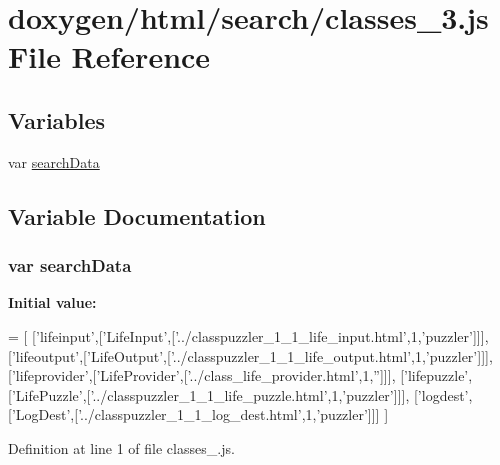 \hypertarget{a00064}{}\section{doxygen/html/search/classes\+\_\+3.js File Reference}
\label{a00064}
\subsection*{Variables}
\begin{DoxyCompactItemize}
\item 
var \hyperlink{a00064_ad01a7523f103d6242ef9b0451861231e}{search\+Data}
\end{DoxyCompactItemize}


\subsection{Variable Documentation}
\hypertarget{a00064_ad01a7523f103d6242ef9b0451861231e}{}
\subsubsection[{search\+Data}]{\setlength{\rightskip}{0pt plus 5cm}var search\+Data}\label{a00064_ad01a7523f103d6242ef9b0451861231e}
{\bfseries Initial value\+:}
\begin{DoxyCode}
=
[
  [\textcolor{stringliteral}{'lifeinput'},[\textcolor{stringliteral}{'LifeInput'},[\textcolor{stringliteral}{'../classpuzzler\_1\_1\_life\_input.html'},1,\textcolor{stringliteral}{'puzzler'}]]],
  [\textcolor{stringliteral}{'lifeoutput'},[\textcolor{stringliteral}{'LifeOutput'},[\textcolor{stringliteral}{'../classpuzzler\_1\_1\_life\_output.html'},1,\textcolor{stringliteral}{'puzzler'}]]],
  [\textcolor{stringliteral}{'lifeprovider'},[\textcolor{stringliteral}{'LifeProvider'},[\textcolor{stringliteral}{'../class\_life\_provider.html'},1,\textcolor{stringliteral}{''}]]],
  [\textcolor{stringliteral}{'lifepuzzle'},[\textcolor{stringliteral}{'LifePuzzle'},[\textcolor{stringliteral}{'../classpuzzler\_1\_1\_life\_puzzle.html'},1,\textcolor{stringliteral}{'puzzler'}]]],
  [\textcolor{stringliteral}{'logdest'},[\textcolor{stringliteral}{'LogDest'},[\textcolor{stringliteral}{'../classpuzzler\_1\_1\_log\_dest.html'},1,\textcolor{stringliteral}{'puzzler'}]]]
]
\end{DoxyCode}


Definition at line 1 of file classes\+\_.\+js.

